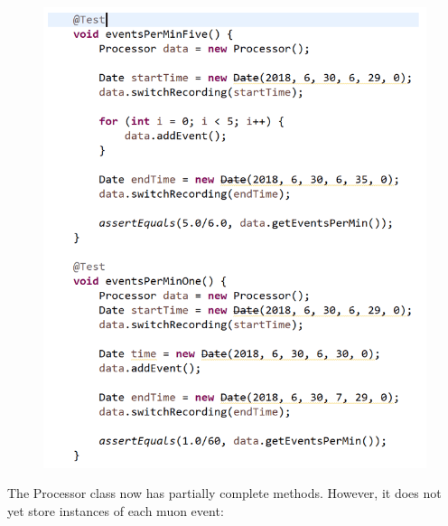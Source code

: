 \documentclass[11pt,a4paper]{article}
\begin{document}
\begin{figure}[h]
	\includegraphics[width=1.0\textwidth]{codeimg5.png}
	\end{figure}
	
	
\newpage
The Processor class now has partially complete methods. However, it does not yet store instances of each muon event:
\end{document}
